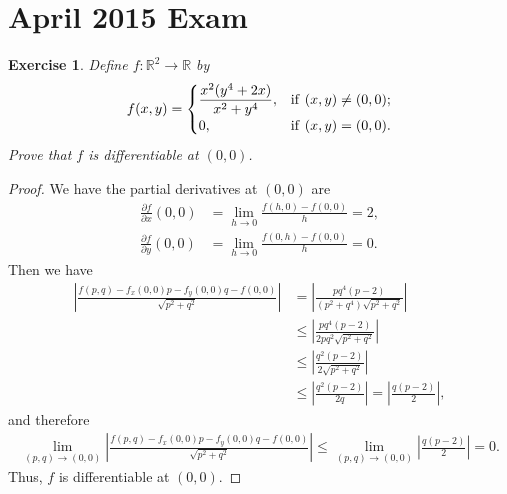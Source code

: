 \documentclass[11pt]{article}
\newtheorem{exercise}{Exercise}[section]
\theoremstyle{definition}
\numberwithin{equation}{subsection}
\begin{document}
\newpage
\section{April 2015 Exam}

\begin{exercise}
Define $f: \mathbb{R}^2 \to \mathbb{R}$ by
\begin{align*}
    f(x,y) = \begin{cases}
        \displaystyle \frac{x^2 (y^4 + 2x)}{x^2 + y^4}, & {\rm if}\,\, (x,y) \neq (0,0); \\
        0, & {\rm if}\,\, (x,y) = (0,0).
    \end{cases}
\end{align*}
Prove that $f$ is differentiable at $(0,0)$.
\end{exercise}
\begin{proof}
We have the partial derivatives at $(0,0)$ are
\begin{align*}
    \frac{\partial f}{\partial x}(0,0) & = \lim_{h\to 0} \frac{f(h,0) - f(0,0)}{h} = 2, \\
    \frac{\partial f}{\partial y}(0,0) & = \lim_{h\to 0} \frac{f(0,h) - f(0,0)}{h} = 0.
\end{align*}
Then we have
\begin{align*}
    \left| \frac{f(p,q) - f_x(0,0)p - f_y(0,0)q - f(0,0)}{\sqrt{p^2 + q^2}} \right| & = \left| \frac{pq^4 (p - 2)}{(p^2 + q^4) \sqrt{p^2 + q^2}} \right| \\
    & \leq \left| \frac{pq^4 (p - 2)}{ 2pq^2 \sqrt{p^2 + q^2}} \right| \\
    & \leq \left| \frac{q^2 (p - 2)}{ 2\sqrt{p^2 + q^2}} \right| \\
    & \leq \left| \frac{q^2 (p - 2)}{2q} \right| = \left| \frac{q(p - 2)}{2} \right|,
\end{align*}
and therefore
\begin{align*}
    \lim_{(p,q) \to (0,0)} \left| \frac{f(p,q) - f_x(0,0)p - f_y(0,0)q - f(0,0)}{\sqrt{p^2 + q^2}} \right| \leq \lim_{(p,q) \to (0,0)} \left| \frac{q(p - 2)}{2} \right| = 0.
\end{align*}
Thus, $f$ is differentiable at $(0,0)$.
\end{proof}

\medskip
\end{document}
